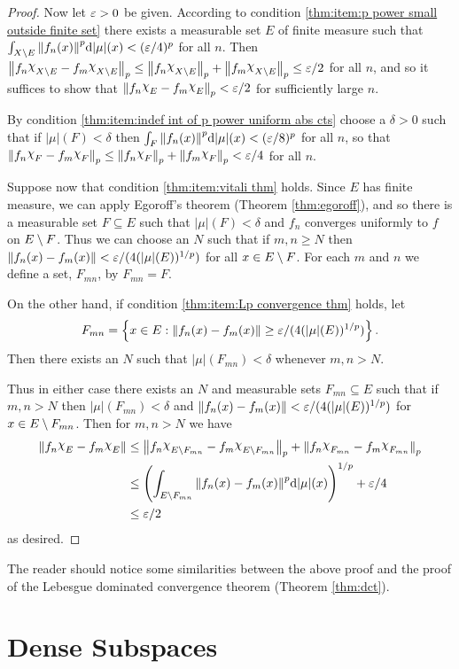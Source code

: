 \begin{proof}
Now let $\varepsilon>0$ be given. According to condition \ref{thm:item:p power small outside finite set} there exists a measurable set $E$ of finite measure such that $\int_{X\setminus E}\norm{f_n(x)}^p\dd|\mu|(x)<(\varepsilon/4)^p$ for all $n$. Then $\norm{f_n\idf{X\sd E}-f_m\idf{X\sd E}}_p\leq\norm{f_n\idf{X\sd E}}_p+\norm{f_m\idf{X\sd E}}_p\leq\ep/2$ for all $n$, and so it suffices to show that $\norm{f_n\idf{E}-f_m\idf{E}}_p<\varepsilon/2$ for sufficiently large $n$.

By condition \ref{thm:item:indef int of p power uniform abs cts} choose a $\delta>0$ such that if $|\mu|(F)<\delta$ then $\int_F\norm{f_n(x)}^p\dd|\mu|(x)<(\varepsilon/8)^p$ for all $n$, so that
$\norm{f_n\idf{F}-f_m\idf{F}}_p\leq\norm{f_n\idf{F}}_p+\norm{f_m\idf{F}}_p<\ep/4$ for all $n$.

Suppose now that condition \ref{thm:item:vitali thm} holds. Since $E$ has finite measure, we can apply Egoroff's theorem (Theorem \ref{thm:egoroff}), and so there is a measurable set $F\subseteq E$ such that $|\mu|(F)<\delta$ and $f_n$ converges uniformly to $f$ on $E\setminus F$. Thus we can choose an $N$ such that if $m,n\geq N$ then $\norm{f_n(x)-f_m(x)}<\varepsilon/(4(|\mu|(E))^{1/p})$ for all $x\in E\setminus F$. For each $m$ and $n$ we define a set, $F_{mn}$, by $F_{mn}=F$.

On the other hand, if condition \ref{thm:item:Lp convergence thm} holds, let \[F_{mn}=\left\{x\in E:\norm{f_n(x)-f_m(x)}\geq\varepsilon/(4(|\mu|(E))^{1/p})\right\}.\] Then there exists an $N$ such that $|\mu|(F_{mn})<\delta$ whenever $m, n>N$.

Thus in either case there exists an $N$ and measurable sets $F_{mn}\subseteq E$ such that if $m,n>N$ then $|\mu|(F_{mn})<\delta$ and $\norm{f_n(x)-f_m(x)}<\varepsilon/(4(|\mu|(E))^{1/p})$ for $x\in E\setminus F_{mn}$. Then for $m, n>N$ we have
\begin{align*}
    \norm{f_n\idf{E}-f_m\idf{E}}&\leq\norm{f_n\idf{E\sd F_{mn}}-f_m\idf{E\sd F_{mn}}}_p+\norm{f_n\idf{F_{mn}}-f_m\idf{F_{mn}}}_p\\
    &\leq\br{\int_{E\sd F_{mn}}\norm{f_n(x)-f_m(x)}^p\dd|\mu|(x)}^{1/p}+\ep/4\\
    &\leq\ep/2
\end{align*}
as desired.
\end{proof}

The reader should notice some similarities between the above proof and the proof of the Lebesgue dominated convergence theorem (Theorem \ref{thm:dct}).

\section{Dense Subspaces}

